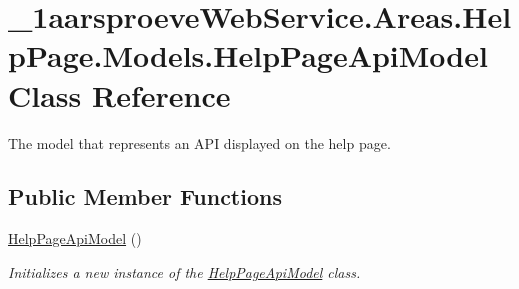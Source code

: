 \hypertarget{class__1aarsproeve_web_service_1_1_areas_1_1_help_page_1_1_models_1_1_help_page_api_model}{}\section{\+\_\+1aarsproeve\+Web\+Service.\+Areas.\+Help\+Page.\+Models.\+Help\+Page\+Api\+Model Class Reference}
\label{class__1aarsproeve_web_service_1_1_areas_1_1_help_page_1_1_models_1_1_help_page_api_model}


The model that represents an A\+P\+I displayed on the help page.  


\subsection*{Public Member Functions}
\begin{DoxyCompactItemize}
\item 
\hyperlink{class__1aarsproeve_web_service_1_1_areas_1_1_help_page_1_1_models_1_1_help_page_api_model_aea81d3b4b0294cd9753efb03c91bf2eb}{Help\+Page\+Api\+Model} ()
\begin{DoxyCompactList}\small\item\em Initializes a new instance of the \hyperlink{class__1aarsproeve_web_service_1_1_areas_1_1_help_page_1_1_models_1_1_help_page_api_model}{Help\+Page\+Api\+Model} class. \end{DoxyCompactList}\end{DoxyCompactItemize}
